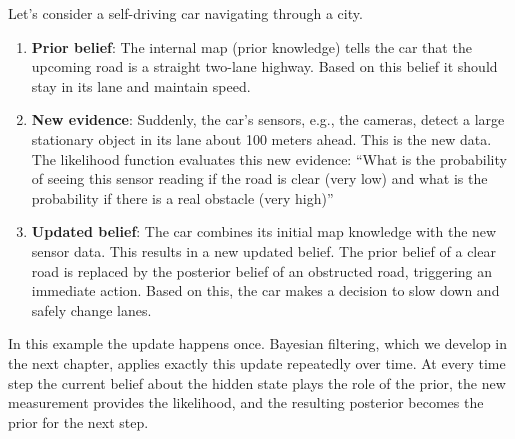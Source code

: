 \begin{example}
 Let's consider a self-driving car navigating through a city.
\begin{enumerate}
    \item \textbf{Prior belief}: The internal map (prior knowledge) tells the car that the upcoming road is a straight two-lane highway. Based on this belief it should stay in its lane and maintain speed. 
    \item \textbf{New evidence}: Suddenly, the car's sensors, e.g., the cameras, detect a large stationary object in its lane about 100 meters ahead. This is the new data. The likelihood function evaluates this new evidence: ``What is the probability of seeing this sensor reading if the road is clear (very low) and what is the probability if there is a real obstacle (very high)'' 
    \item \textbf{Updated belief}: The car combines its initial map knowledge with the new sensor data. This results in a new updated belief. The prior belief of a clear road is replaced by the posterior belief of an obstructed road, triggering an immediate action. Based on this, the car makes a decision to slow down and safely change lanes. 
\end{enumerate}
\end{example} 
In this example the update happens once. Bayesian filtering, which we develop in the next chapter, applies exactly this update repeatedly over time. At every time step the current belief about the hidden state plays the role of the prior, the new measurement provides the likelihood, and the resulting posterior becomes the prior for the next step.
